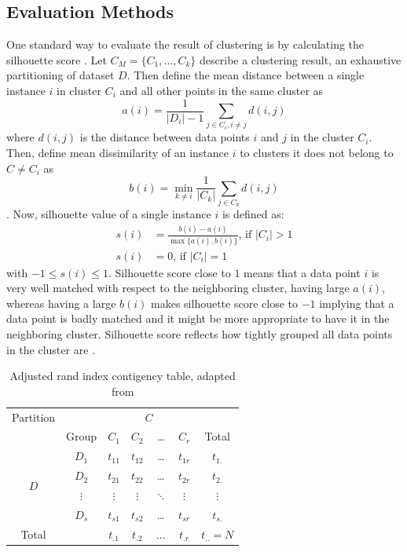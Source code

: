 
\subsection{Evaluation Methods}
\label{sec:clus_evaluation}

One standard way to evaluate the result of clustering is by
calculating the silhouette score \citep{reynolds2006clustering}. 
Let $C_M = \{C_1, \dots, C_k\}$ describe a clustering result, an 
exhaustive partitioning of dataset $D$. Then define the mean distance
between a single instance $i$ in cluster $C_i$ and all other points in the same cluster as
$$
a(i) = \frac{1}{|D_i| - 1} \sum_{j \in C_i, i \neq j} d(i, j)
$$
where $d(i, j)$ is the distance between data points $i$ and $j$ in
the cluster $C_i$. Then, define mean dissimilarity of an instance $i$ to
clusters it does not belong to $C \neq C_i$ as
$$
b(i) = \min_{k \neq i} \frac{1}{|C_k|} \sum_{j \in C_k} d(i, j)
$$.
Now, silhouette value of a single instance $i$ is defined as:
\begin{align}\label{eq:silhouette}
	s(i) &= \frac{b(i) - a(i)}{\max\{a(i), b(i)\}} \textrm{, if } |C_i| > 1 \\
	s(i) &= 0 \textrm{, if } |C_i| = 1
\end{align}
with $-1 \leq s(i) \leq 1$. Silhouette score close to $1$ means that a data point $i$
is very well matched with respect to the neighboring cluster, having large $a(i)$, whereas
having a large $b(i)$ makes silhouette score close to $-1$ implying that a data point is badly matched 
and it might be more appropriate to have it in the neighboring cluster. 
Silhouette score reflects how tightly grouped all data points in the cluster are
\citep{kaufman2009finding}.

\begin{table}
	\centering
	\begin{tabular}{c c c c c c c}
		\toprule
		Partition & & \multicolumn{4}{c}{$C$} & \\ \cline{3-6}
		& Group & $C_1$ & $C_2$ & \dots & $C_r$ & Total \\
		\midrule
		\multirow{4}{*}{$D$} & $D_1$ & $t_{11}$ & $t_{12}$ & \dots & $t_{1r}$ & $t_{1.}$ \\
		                     & $D_2$ & $t_{21}$ & $t_{22}$ & \dots & $t_{2r}$ & $t_{2.}$ \\
				     & $\vdots$ & $\vdots$ & $\vdots$ & $\ddots$ & $\vdots$ & $\vdots$ \\
		                     & $D_s$ & $t_{s1}$ & $t_{s2}$ & \dots & $t_{sr}$ & $t_{s.}$ \\
				     \midrule
		Total & &                      $t_{.1}$ & $t_{.2}$ & $\dots$&$t_{.r}$ & $t_{..} = N$ \\
				     \bottomrule
	\end{tabular}
	\caption{Adjusted rand index contigency table, adapted from \citep{santos2009use}}
	\label{tab:adjusted_rand}
\end{table}

